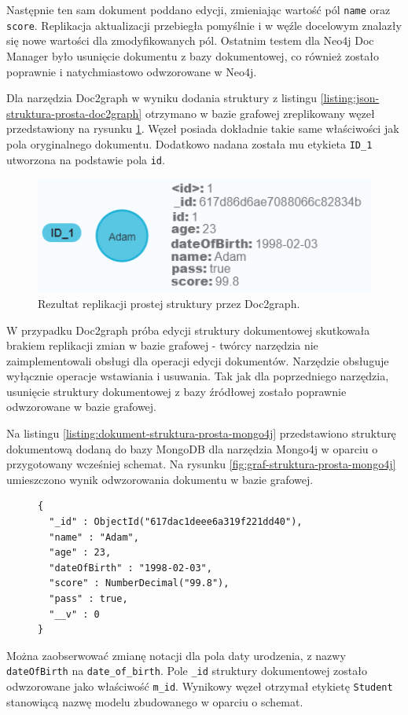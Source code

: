 \documentclass[a4paper,twoside,12pt]{book}
\begin{document}
Następnie ten sam dokument poddano edycji, zmieniając wartość pól \texttt{name} oraz \texttt{score}. Replikacja aktualizacji przebiegła pomyślnie i w węźle docelowym znalazły się nowe wartości dla zmodyfikowanych pól. Ostatnim testem dla Neo4j Doc Manager było usunięcie dokumentu z bazy dokumentowej, co również zostało poprawnie i natychmiastowo odwzorowane w Neo4j. 

Dla narzędzia Doc2graph w wyniku dodania struktury z listingu \ref{listing:json-struktura-prosta-doc2graph} otrzymano w bazie grafowej zreplikowany węzeł przedstawiony na rysunku \ref{fig:graf-struktura-prosta-doc2graph}. Węzeł posiada dokładnie takie same właściwości jak pola oryginalnego dokumentu. Dodatkowo nadana została mu etykieta \texttt{ID\_1} utworzona na podstawie pola \texttt{id}. 

\begin{figure}[!h]
\centering
\includegraphics[width=12cm]{images/struktura_prosta_doc2graph.png}
\caption{Rezultat replikacji prostej struktury przez Doc2graph.}
\label{fig:graf-struktura-prosta-doc2graph}
\end{figure}

W przypadku Doc2graph próba edycji struktury dokumentowej skutkowała brakiem replikacji zmian w bazie grafowej - twórcy narzędzia nie zaimplementowali obsługi dla operacji edycji dokumentów. Narzędzie obsługuje wyłącznie operacje wstawiania i usuwania. Tak jak dla poprzedniego narzędzia, usunięcie struktury dokumentowej z bazy źródłowej zostało poprawnie odwzorowane w bazie grafowej. 

Na listingu \ref{listing:dokument-struktura-prosta-mongo4j} przedstawiono strukturę dokumentową dodaną do bazy MongoDB dla narzędzia Mongo4j w oparciu o przygotowany wcześniej schemat. Na rysunku \ref{fig:graf-struktura-prosta-mongo4j} umieszczono wynik odwzorowania dokumentu w bazie grafowej. 
\begin{figure}
\begin{lstlisting}[style=JSON, caption={Struktura prostego dokumentu wstawiona przez Mongo4j.}, label={listing:dokument-struktura-prosta-mongo4j}, captionpos=b]
{
  "_id" : ObjectId("617dac1deee6a319f221dd40"),
  "name" : "Adam",
  "age" : 23,
  "dateOfBirth" : "1998-02-03",
  "score" : NumberDecimal("99.8"),
  "pass" : true,
  "__v" : 0
}
\end{lstlisting}
\end{figure}
Można zaobserwować zmianę notacji dla pola daty urodzenia, z nazwy \texttt{dateOfBirth} na \texttt{date\_of\_birth}. Pole \texttt{\_id} struktury dokumentowej zostało odwzorowane jako właściwość \texttt{m\_id}. Wynikowy węzeł otrzymał etykietę \texttt{Student} stanowiącą nazwę modelu zbudowanego w oparciu o schemat.
\end{document}
